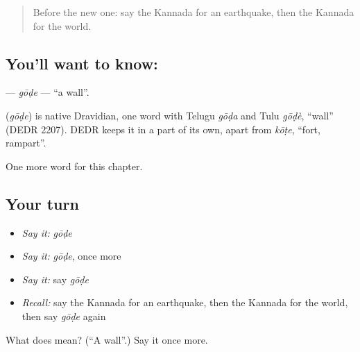 \label{lesson:KA-C287-gode}



\begin{quote}
Before the new one: say the Kannada for an earthquake, then the Kannada for the world.
\end{quote}

\subsection*{You'll want to know: }
\textbf{} — \emph{gōḍe} — \textquotedblleft{}a wall\textquotedblright{}.

\begin{cousinweb}
\textbf{} (\emph{gōḍe}) is native Dravidian, one word with Telugu \emph{gōḍa} and Tulu \emph{gōḍè}, \textquotedblleft{}wall\textquotedblright{} (DEDR 2207). DEDR keeps it in a part of its own, apart from \emph{kōṭe}, \textquotedblleft{}fort, rampart\textquotedblright{}.
\end{cousinweb}

\begin{grammarlens}[title={What you've built}]
One more word for this chapter.
\end{grammarlens}

\subsection*{Your turn}
\begin{itemize}
\raggedright
  \item \emph{Say it:} \emph{gōḍe}
  \item \emph{Say it:} \emph{gōḍe}, once more
  \item \emph{Say it:} say \emph{gōḍe}
  \item \emph{Recall:} say the Kannada for an earthquake, then the Kannada for the world, then say \emph{gōḍe} again
\end{itemize}

\begin{tcolorbox}[breakable,colback=teal!4,colframe=teal!35!black,title={Before you move on}]
What does  mean? (\textquotedblleft{}A wall\textquotedblright{}.) Say it once more.
\end{tcolorbox}
